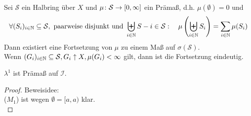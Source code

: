 \documentclass[a4paper, 11pt, ngerman]{scrartcl}
\begin{document}
\begin{thm}
	Sei $\mathcal{S}$ ein Halbring über $X$ und $\mu \colon \mathcal{S} \to [0,\infty]$ ein Prämaß, d.h. $\mu(\emptyset) = 0$ und
	\begin{align*}
		\forall (S_i)_{i \in \mathbb{N}} \subseteq \mathcal{S}, \text{ paarweise disjunkt und } \biguplus_{i \in \mathbb{N}}{S-i} \in \mathcal{S} : \quad \mu\left(\biguplus_{i \in \mathbb{N}}{S_i}\right) = \sum_{i \in \mathbb{N}}{\mu(S_i)}
	\end{align*}
	Dann existiert eine Fortsetzung von $\mu$ zu einem Maß auf $\sigma(\mathcal{S})$. \\
	Wenn $(G_i)_{i \in \mathbb{N}} \subseteq \mathcal{S}, G_i \uparrow X, \mu(G_i) < \infty$ gilt, dann ist die Fortsetzung eindeutig.
\end{thm}

\begin{satz}
	$\lambda^1$ ist Prämaß auf $\mathcal{I}$.
\end{satz}
\begin{proof}
	Beweisidee: \\
	($M_1$) ist wegen $\emptyset = [a,a)$ klar. \\
	
\end{proof}
\end{document}
